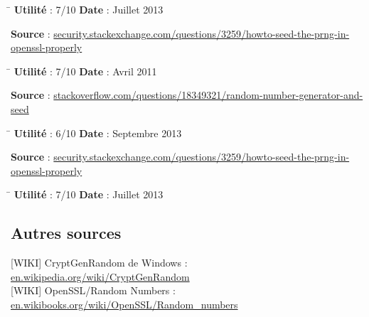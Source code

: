 \documentclass{article}
\begin{document}
		\begin{tabbing}
			\hspace{10cm}\=\kill
			\textbf{Utilité} : 7/10 \>	\textbf{Date} : Juillet 2013\\
		\end{tabbing}

		\textbf{Source} : \href{http://security.stackexchange.com/questions/3259/howto-seed-the-	prng-in-openssl-properly}
		{security.stackexchange.com/questions/3259/howto-seed-the-prng-in-openssl-properly}\\

		\begin{tabbing}
			\hspace{10cm}\=\kill
			\textbf{Utilité} : 7/10 \>	\textbf{Date} : Avril 2011\\
		\end{tabbing}

		\textbf{Source} : \href{http://stackoverflow.com/questions/18349321/random-number-generator-and-seed}
		 {stackoverflow.com/questions/18349321/random-number-generator-and-seed}
		 
		\begin{tabbing}
			\hspace{10cm}\=\kill
			\textbf{Utilité} : 6/10 \>	\textbf{Date} : Septembre 2013\\
		\end{tabbing}

		\textbf{Source} : \href{http://security.stackexchange.com/questions/3259/howto-seed-the-prng-in-openssl-properly}
		{security.stackexchange.com/questions/3259/howto-seed-the-prng-in-openssl-properly}
		
		\begin{tabbing}
			\hspace{10cm}\=\kill
			\textbf{Utilité} : 7/10 \>	\textbf{Date} : Juillet 2013\\
		\end{tabbing}

	\subsection{Autres sources}

		[WIKI] CryptGenRandom de Windows : \href{http://en.wikipedia.org/wiki/CryptGenRandom}
		{en.wikipedia.org/wiki/CryptGenRandom}\\

		[WIKI] OpenSSL/Random Numbers : \href{http://en.wikibooks.org/wiki/OpenSSL/Random\_numbers}
		{en.wikibooks.org/wiki/OpenSSL/Random\_numbers}\\
\end{document}
